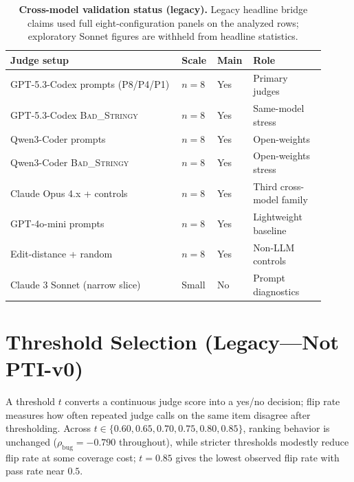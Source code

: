 \documentclass{article}
\begin{document}
\begin{table}[h]
  \centering
  \scriptsize
  \setlength{\tabcolsep}{3pt}%
  \begin{tabular}{@{}>{\raggedright\arraybackslash}p{0.52\linewidth}
    >{\centering\arraybackslash}p{0.09\linewidth}
    >{\centering\arraybackslash}p{0.08\linewidth}
    >{\raggedright\arraybackslash}p{0.22\linewidth}@{}}
    \toprule
    \textbf{Judge setup} & \textbf{Scale} & \textbf{Main} & \textbf{Role} \\
    \midrule
    GPT-5.3-Codex prompts (P8/P4/P1) & $n{=}8$ & Yes & Primary judges \\
    GPT-5.3-Codex \textsc{Bad\_Stringy} & $n{=}8$ & Yes & Same-model stress \\
    Qwen3-Coder prompts & $n{=}8$ & Yes & Open-weights \\
    Qwen3-Coder \textsc{Bad\_Stringy} & $n{=}8$ & Yes & Open-weights stress \\
    Claude Opus 4.x + controls & $n{=}8$ & Yes & Third cross-model family \\
    GPT-4o-mini prompts & $n{=}8$ & Yes & Lightweight baseline \\
    Edit-distance + random & $n{=}8$ & Yes & Non-LLM controls \\
    Claude 3 Sonnet (narrow slice) & Small & No & Prompt diagnostics \\
    \bottomrule
  \end{tabular}
  \caption{\textbf{Cross-model validation status (legacy).} Legacy headline bridge claims used full eight-configuration panels on the analyzed rows; exploratory Sonnet figures are withheld from headline statistics.}
  \label{tab:app-cross-model-status}
\end{table}

\section{Threshold Selection (Legacy---Not PTI-v0)}\label{app:threshold}

A threshold $t$ converts a continuous judge score into a yes/no decision; flip rate measures how often repeated judge calls on the same item disagree after thresholding.
Across $t \in \{0.60, 0.65, 0.70, 0.75, 0.80, 0.85\}$, ranking behavior is unchanged ($\rho_{\text{bug}}=-0.790$ throughout), while stricter thresholds modestly reduce flip rate at some coverage cost; $t=0.85$ gives the lowest observed flip rate with pass rate near $0.5$.
\end{document}

